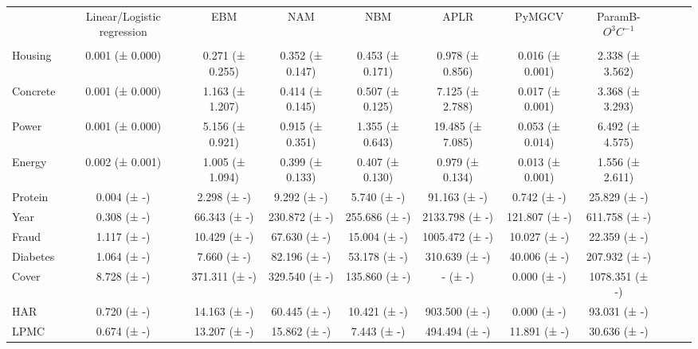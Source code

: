 \begin{tabular}{lcccccccccc}
\toprule
 & Linear/Logistic regression & EBM & NAM & NBM & APLR & PyMGCV & ParamB-$O^3C^{-1}$ \\
 &  &  &  &  &  &  &  \\
\midrule
Housing & 0.001 (± 0.000) & 0.271 (± 0.255) & 0.352 (± 0.147) & 0.453 (± 0.171) & 0.978 (± 0.856) & 0.016 (± 0.001) & 2.338 (± 3.562) \\
Concrete & 0.001 (± 0.000) & 1.163 (± 1.207) & 0.414 (± 0.145) & 0.507 (± 0.125) & 7.125 (± 2.788) & 0.017 (± 0.001) & 3.368 (± 3.293) \\
Power & 0.001 (± 0.000) & 5.156 (± 0.921) & 0.915 (± 0.351) & 1.355 (± 0.643) & 19.485 (± 7.085) & 0.053 (± 0.014) & 6.492 (± 4.575) \\
Energy & 0.002 (± 0.001) & 1.005 (± 1.094) & 0.399 (± 0.133) & 0.407 (± 0.130) & 0.979 (± 0.134) & 0.013 (± 0.001) & 1.556 (± 2.611) \\
Protein & 0.004 (± -) & 2.298 (± -) & 9.292 (± -) & 5.740 (± -) & 91.163 (± -) & 0.742 (± -) & 25.829 (± -) \\
Year & 0.308 (± -) & 66.343 (± -) & 230.872 (± -) & 255.686 (± -) & 2133.798 (± -) & 121.807 (± -) & 611.758 (± -) \\
Fraud & 1.117 (± -) & 10.429 (± -) & 67.630 (± -) & 15.004 (± -) & 1005.472 (± -) & 10.027 (± -) & 22.359 (± -) \\
Diabetes & 1.064 (± -) & 7.660 (± -) & 82.196 (± -) & 53.178 (± -) & 310.639 (± -) & 40.006 (± -) & 207.932 (± -) \\
Cover & 8.728 (± -) & 371.311 (± -) & 329.540 (± -) & 135.860 (± -) & - (± -) & 0.000 (± -) & 1078.351 (± -) \\
HAR & 0.720 (± -) & 14.163 (± -) & 60.445 (± -) & 10.421 (± -) & 903.500 (± -) & 0.000 (± -) & 93.031 (± -) \\
LPMC & 0.674 (± -) & 13.207 (± -) & 15.862 (± -) & 7.443 (± -) & 494.494 (± -) & 11.891 (± -) & 30.636 (± -) \\
\bottomrule
\end{tabular}
